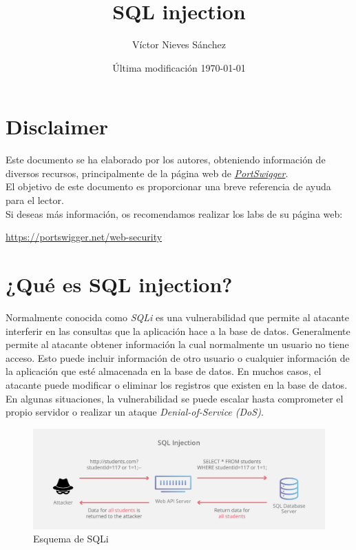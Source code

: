 \documentclass[bibliography=totocnumbered]{scrartcl}
\title{SQL injection}
\author{Víctor Nieves Sánchez}
\date{Última modificación \today{}}
\newcommand{\changeurlcolor}[1]{\hypersetup{urlcolor=#1}}
\begin{document}
\maketitle
\section*{Disclaimer}
Este documento se ha elaborado por los autores, obteniendo información de diversos recursos, principalmente de la página web de \changeurlcolor{blue}\href{https://portswigger.net/web-security}{\textit{PortSwigger}}.\\

El objetivo de este documento es proporcionar una breve referencia de ayuda para el lector.\\

Si deseas más información, os recomendamos realizar los labs de su página web:
\begin{center}
\changeurlcolor{blue}\href{https://portswigger.net/web-security}{https://portswigger.net/web-security}    
\end{center}

\newpage
\tableofcontents

\newpage
\listoffigures

\newpage

\section{¿Qué es SQL injection?}
Normalmente conocida como \textit{SQLi} es una vulnerabilidad que permite al atacante interferir en las consultas que la aplicación hace a la base de datos. Generalmente permite al atacante obtener información la cual normalmente un usuario no tiene acceso. Esto puede incluir información de otro usuario o cualquier información de la aplicación que esté almacenada en la base de datos. En muchos casos, el atacante puede modificar o eliminar los registros que existen en la base de datos.\\

En algunas situaciones, la vulnerabilidad se puede escalar hasta comprometer el propio servidor o realizar un ataque \textit{Denial-of-Service (DoS)}.

\begin{figure}[h]
  \includegraphics[width=\linewidth]{figures/SQLi.png}
  \caption{Esquema de SQLi}
  \label{fig:SQLi1}
\end{figure}
\end{document}
